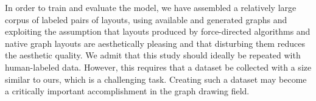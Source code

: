 In order to train and evaluate the model, we have assembled a relatively large corpus of labeled pairs of layouts, using
available and generated graphs and exploiting the assumption that layouts produced by force-directed algorithms and
native graph layouts are aesthetically pleasing and that disturbing them reduces the aesthetic quality.  We admit that
this study should ideally be repeated with human-labeled data.  However, this requires that a dataset be collected with
a size similar to ours, which is a challenging task.  Creating such a dataset may become a critically important
accomplishment in the graph drawing field.
